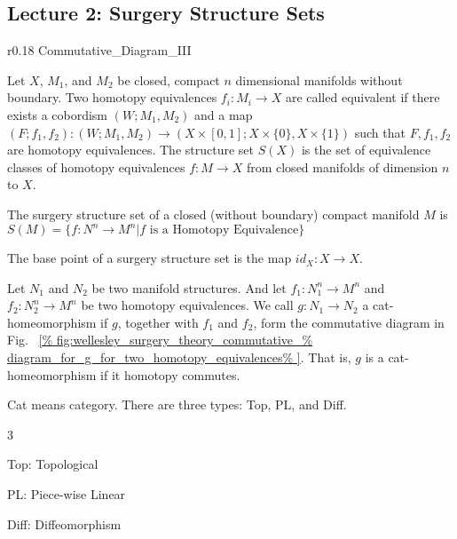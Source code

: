 \documentclass[crop=false,class=book,oneside]{standalone}
\begin{document}
    \subsection{Lecture 2: Surgery Structure Sets}
        \begin{wrapfigure}[8]{r}{0.18\textwidth}
            \centering
            \captionsetup{type=figure}
            \vspace{-4ex}
            {Commutative_Diagram_III}
            \caption{Example of a Commutative Diagram.}
            \label{fig:wellesley_surgery_theory_commutative_%
                   diagram_for_g_for_two_homotopy_equivalences}
        \end{wrapfigure}
        Let $X$, $M_{1}$, and $M_{2}$ be closed,
        compact $n$ dimensional manifolds without boundary.
        Two homotopy equivalences $f_{i}:M_{i}\rightarrow X$
        are called equivalent if there exists a cobordism
        $(W;M_{1},M_{2})$ and a map
        $(F;f_{1},f_{2}):(W;M_{1},M_{2})%
         \rightarrow(X\times[0,1];X\times\{0\},X\times\{1\})$
        such that $F,f_{1},f_{2}$ are homotopy equivalences.
        The structure set $S(X)$ is the set of equivalence
        classes of homotopy equivalences $f:M\rightarrow X$
        from closed manifolds of dimension $n$ to $X$.
        \hfill
        \begin{definition}
            The surgery structure set of a closed
            (without boundary) compact manifold $M$ is
            $S(M)=\{f:N^{n}\rightarrow{M^{n}}|f%
             \textrm{ is a Homotopy Equivalence}\}$
        \end{definition}
        \begin{definition}
            The base point of a surgery structure
            set is the map $id_{X}:X\rightarrow X$.
        \end{definition}
        Let $N_{1}$ and $N_{2}$ be two manifold structures.
        And let $f_{1}:N_{1}^{n}\rightarrow M^{n}$ and
        $f_{2}:N_{2}^{n}\rightarrow M^{n}$ be two homotopy
        equivalences. We call $g:N_{1}\rightarrow N_{2}$ a
        cat-homeomorphism if $g$, together with $f_{1}$ and
        $f_{2}$, form the commutative diagram in Fig.~%
        \ref{%
            fig:wellesley_surgery_theory_commutative_%
            diagram_for_g_for_two_homotopy_equivalences%
        }.
        That is, $g$ is a cat-homeomorphism if it
        homotopy commutes.
        \begin{remark}
            Cat means category. There are three types:
            Top, PL, and Diff. 
            \begin{itemize}
                \begin{multicols}{3}
                    \item Top: Topological
                    \item PL: Piece-wise Linear
                    \item Diff: Diffeomorphism
                \end{multicols}
            \end{itemize}
        \end{remark}
\end{document}
